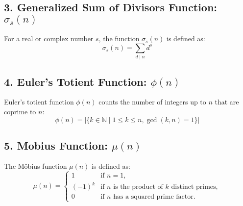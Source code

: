 \documentclass[11pt]{article}
\newcommand\0{\mathbf{0}}
\newcommand\<{\langle}
\renewcommand\>{\rangle}
\begin{document}
\begin{enumerate}
\subsection*{3. Generalized Sum of Divisors Function: \(\sigma_s(n)\)}
For a real or complex number \(s\), the function \(\sigma_s(n)\) is defined as:
\[
\sigma_s(n) = \sum_{d \mid n} d^s
\]
\subsection*{4. Euler's Totient Function: \(\phi(n)\)}
Euler's totient function \(\phi(n)\) counts the number of integers up to \(n\) that are coprime to \(n\):
\[
\phi(n) = \left| \{k \in \mathbb{N} \mid 1 \leq k \leq n, \gcd(k, n) = 1\} \right|
\]

\subsection*{5. Mobius Function: \(\mu(n)\)}
The Möbius function \(\mu(n)\) is defined as:
\[
\mu(n) = 
\begin{cases}
1 & \text{if } n = 1, \\
(-1)^k & \text{if } n \text{ is the product of } k \text{ distinct primes}, \\
0 & \text{if } n \text{ has a squared prime factor}.
\end{cases}
\]


\end{enumerate}
\end{document}
